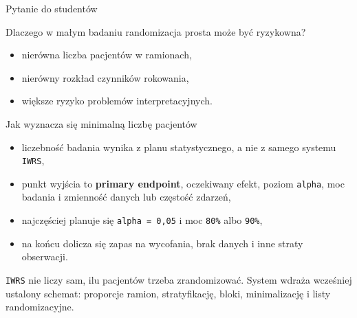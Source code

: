 \begin{frame}{Pytanie do studentów}
  \begin{QuestionBox}
    Dlaczego w małym badaniu randomizacja prosta może być ryzykowna?
  \end{QuestionBox}

  \vspace{0.25cm}

  \begin{itemize}
    \item nierówna liczba pacjentów w ramionach,
    \item nierówny rozkład czynników rokowania,
    \item większe ryzyko problemów interpretacyjnych.
  \end{itemize}
\end{frame}

\begin{frame}{Jak wyznacza się minimalną liczbę pacjentów}
  \begin{itemize}
    \item liczebność badania wynika z planu statystycznego, a nie z samego systemu \texttt{IWRS},
    \item punkt wyjścia to \textbf{primary endpoint}, oczekiwany efekt, poziom \texttt{alpha}, moc badania i zmienność danych lub częstość zdarzeń,
    \item najczęściej planuje się \texttt{alpha = 0{,}05} i moc \texttt{80\%} albo \texttt{90\%},
    \item na końcu dolicza się zapas na wycofania, brak danych i inne straty obserwacji.
  \end{itemize}

  \vspace{0.2cm}

  \begin{ExampleBox}
    \texttt{IWRS} nie liczy sam, ilu pacjentów trzeba zrandomizować. System wdraża wcześniej ustalony schemat: proporcje ramion, stratyfikację, bloki, minimalizację i listy randomizacyjne.
  \end{ExampleBox}
\end{frame}

